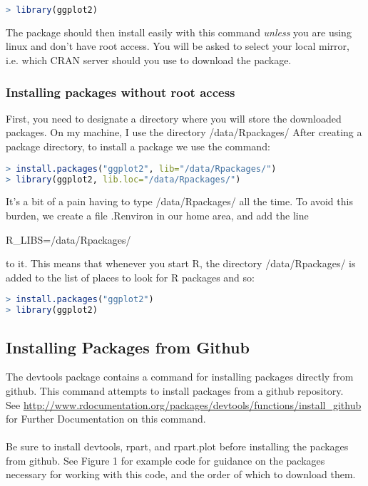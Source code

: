 \documentclass{article}
\begin{document}
\begin{lstlisting}[language=R]
> library(ggplot2)
\end{lstlisting}

The package should then install easily with this command \textit{unless} you are using linux and don't have root access. 
You will be asked to select your local mirror, i.e. which CRAN server should you use to download the package.

\subsubsection{	Installing packages without root access}
First, you need to designate a directory where you will store the downloaded packages. On my machine, I use the directory /data/Rpackages/ After creating a package directory, to install a package we use the command:

\begin{lstlisting}[language=R]
> install.packages("ggplot2", lib="/data/Rpackages/")
> library(ggplot2, lib.loc="/data/Rpackages/")
\end{lstlisting}


It's a bit of a pain having to type /data/Rpackages/ all the time. To avoid this burden,  we create a file .Renviron in our home area, and add the line 
\centerline{R\_LIBS=/data/Rpackages/ }to it. This means that whenever you start R, the directory /data/Rpackages/ is added to the list of places to look for R packages and so:
\begin{lstlisting}[language=R]
> install.packages("ggplot2")
> library(ggplot2)
\end{lstlisting}


\subsection{Installing Packages from Github}
The devtools package contains a command for installing packages directly from github. This command attempts to install packages from a github repository. \\ 
See \url{http://www.rdocumentation.org/packages/devtools/functions/install_github} for Further Documentation on this command. \\ \\
Be sure to install devtools, rpart, and rpart.plot before installing the packages from github. See Figure 1 for example code for guidance on the packages necessary for working with this code, and the order of which to download them. 
\end{document}
